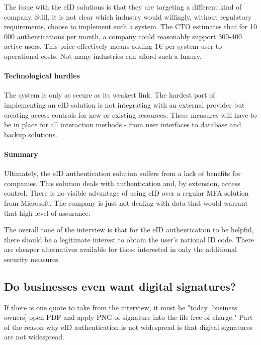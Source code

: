 The issue with the eID solutions is that they are targeting a different kind of company. Still, it is not clear which industry would willingly, without regulatory requirements, choose to implement such a system. The CTO estimates that for 10 000 authentications per month, a company could reasonably support 300-400 active users. This price effectively means adding 1€ per system user to operational costs. Not many industries can afford such a luxury.

\paragraph{Technological hurdles}

The system is only as secure as its weakest link. The hardest part of implementing an eID solution is not integrating with an external provider but creating access controls for new or existing resources. These measures will have to be in place for all interaction methods - from user interfaces to database and backup solutions.


\paragraph{Summary}

Ultimately, the eID authentication solution suffers from a lack of benefits for companies. This solution deals with authentication and, by extension, access control. There is no visible advantage of using eID over a regular MFA solution from Microsoft. The company is just not dealing with data that would warrant that high level of assurance.

The overall tone of the interview is that for the eID authentication to be helpful, there should be a legitimate interest to obtain the user's national ID code. There are cheaper alternatives available for those interested in only the additional security measures.

\subsection{Do businesses even want digital signatures?}

If there is one quote to take from the interview, it must be "today [business owners] open PDF and apply PNG of signature into the file free of charge." Part of the reason why eID authentication is not widespread is that digital signatures are not widespread.

